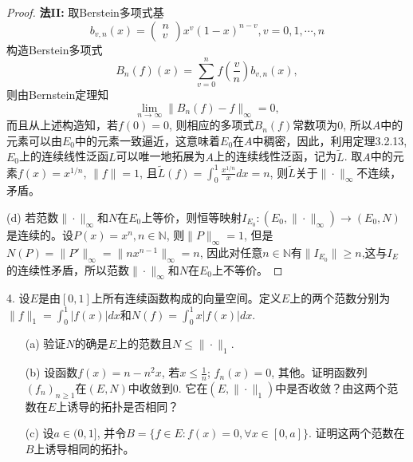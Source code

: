 \documentclass[a4paper,8pt]{ctexart}\textwidth 140mm \textheight 216mm
\newcommand{\8}{\infty}
\begin{document}
\begin{proof}
	\textbf{法II:} 取Berstein多项式基
	\[b_{v,n}(x)=\begin{pmatrix}
	n\\v
	\end{pmatrix}x^v(1-x)^{n-v}, v=0,1,\cdots,n\]
	构造Berstein多项式
	$$B_n(f)(x)=\sum_{v=0}^n f(\frac{v}{n})b_{v,n}(x),$$
	则由Bernstein定理知
	$$\lim_{n\to\infty}\|B_n(f)-f\|_\infty=0,$$
	而且从上述构造知，若$f(0)=0$, 则相应的多项式$B_n(f)$常数项为0, 所以$A$中的元素可以由$E_0$中的元素一致逼近，这意味着$E_0$在$A$中稠密，因此，利用定理3.2.13, $E_0$上的连续线性泛函$L$可以唯一地拓展为$A$上的连续线性泛函，记为$\tilde{L}$. 取$A$中的元素$f(x)=x^{1/n}$, $\|f\|=1$, 且$\tilde{L}(f)=\int_0^1\frac{x^{1/n}}{x}dx=n$, 则$\tilde{L}$关于$\|\cdot\|_\infty$不连续，矛盾。
	
	(d) 若范数$\|\cdot\|_\infty$和$N$在$E_0$上等价，则恒等映射$I_{E_0}:(E_0,\|\cdot\|_\infty)\to(E_0,N)$是连续的。设$P(x)=x^n, n\in\mathbb{N}$, 则$\|P\|_\infty=1$, 但是$N(P)=\|P'\|_\infty=\|nx^{n-1}\|_\infty=n$, 因此对任意$n\in\mathbb{N}$有$\|I_{E_0}\|\geq n$,这与$I_E$的连续性矛盾，所以范数$\|\cdot\|_\infty$和$N$在$E_0$上不等价。
\end{proof}
4. 设$E$是由$[0,1]$上所有连续函数构成的向量空间。定义$E$上的两个范数分别为$\|f\|_1=\int_0^1 |f(x)|dx$和$N(f)=\int_0^1 x|f(x)|dx$.
\begin{enumerate}
	\item[(a)] 验证$N$的确是$E$上的范数且$N\leq \|\cdot\|_1$.
	\item[(b)] 设函数$f(x)=n-n^2x$, 若$x\leq\frac{1}{n}$; $f_n(x)=0$, 其他。证明函数列$(f_n)_{n\geq 1}$在$(E,N)$中收敛到$0$. 它在$(E,\|\cdot\|_1)$中是否收敛？由这两个范数在$E$上诱导的拓扑是否相同？
	\item[(c)] 设$a\in(0,1]$, 并令$B=\{f\in E:f(x)=0,\forall x\in[0,a]\}$. 证明这两个范数在$B$上诱导相同的拓扑。
\end{enumerate}
\end{document}
